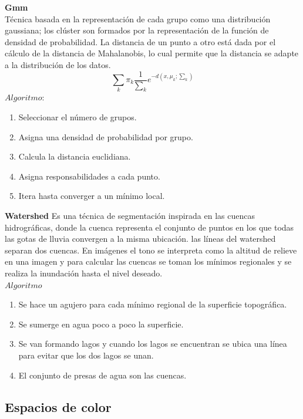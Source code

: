 \documentclass[10pt,twocolumn,letterpaper]{article}
\begin{document}
\textbf{Gmm}
\\
Técnica basada en la representación de cada grupo como una distribución gaussiana; los clúster son formados por la representación de la función de densidad de probabilidad.
La distancia de un punto a otro está dada por el cálculo de la distancia de Mahalanobis, lo cual permite que la distancia se adapte a la distribución de los datos. 
\newline
\\
\begin{equation}
 \sum_{k} \pi_{k}\frac{1}{\sum_k} e^{-d(x,\mu_k;\sum_k)}
\end{equation}
$Algoritmo:$
\begin{enumerate}
\item Seleccionar el número de grupos.
\item Asigna una densidad de probabilidad por grupo.
\item Calcula la distancia euclidiana.
\item Asigna responsabilidades a cada punto.
\item Itera hasta converger a un mínimo local.
\end {enumerate}

\textbf{Watershed}
\newline
Es una técnica de segmentación inspirada en las cuencas hidrográficas, donde la cuenca representa
el conjunto de puntos en los que todas las gotas de lluvia convergen a la misma ubicación. 
las líneas del watershed separan dos cuencas.
En imágenes el tono se interpreta como la altitud de relieve en una imagen y para calcular las cuencas 
se toman los mínimos regionales y se realiza la inundación hasta el nivel deseado.
\newline
\\
$Algoritmo$

\begin{enumerate}
 \item Se hace un agujero para cada mínimo regional de la superficie topográfica.
 \item Se sumerge en agua poco a poco la superficie.
 \item Se van formando lagos y cuando los lagos se encuentran se ubica una línea para evitar que los dos lagos se unan.
 \item El conjunto de presas de agua son las cuencas. 
 \end{enumerate}

\subsection{Espacios de color}
\end{document}
